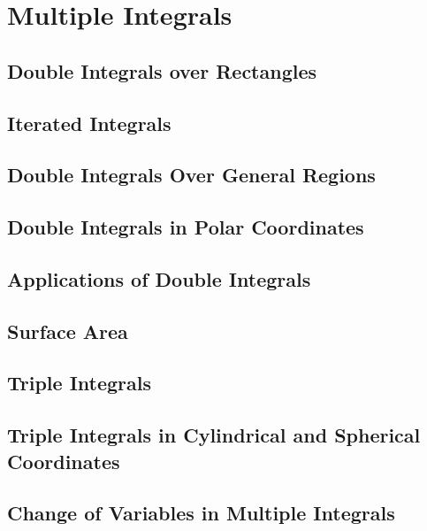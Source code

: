 \setcounter{chapter}{15}
\chapter{Multiple Integrals}

\section{Double Integrals over Rectangles}
\section{Iterated Integrals}
\section{Double Integrals Over General Regions}
\section{Double Integrals in Polar Coordinates}
\section{Applications of Double Integrals}
\section{Surface Area}
\section{Triple Integrals}
\section{Triple Integrals in Cylindrical and Spherical Coordinates}
\section{Change of Variables in Multiple Integrals}
